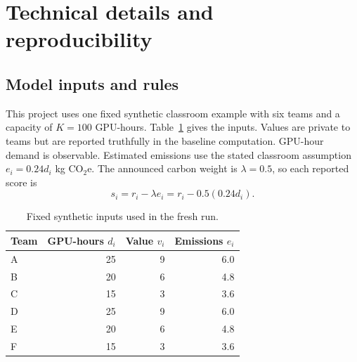 
\appendix
\section{Technical details and reproducibility}

\subsection{Model inputs and rules}

This project uses one fixed synthetic classroom example with six teams and a capacity of $K=100$ GPU-hours. Table~\ref{tab:inputs} gives the inputs. Values are private to teams but are reported truthfully in the baseline computation. GPU-hour demand is observable. Estimated emissions use the stated classroom assumption $e_i=0.24d_i$ kg CO$_2$e. The announced carbon weight is $\lambda=0.5$, so each reported score is
\[
s_i=r_i-\lambda e_i=r_i-0.5(0.24d_i).
\]

\begin{table}[h]
\centering
\caption{Fixed synthetic inputs used in the fresh run.}
\label{tab:inputs}
\begin{tabular}{lrrr}
\toprule
Team & GPU-hours $d_i$ & Value $v_i$ & Emissions $e_i$ \\
\midrule
A & 25 & 9 & 6.0 \\
B & 20 & 6 & 4.8 \\
C & 15 & 3 & 3.6 \\
D & 25 & 9 & 6.0 \\
E & 20 & 6 & 4.8 \\
F & 15 & 3 & 3.6 \\
\bottomrule
\end{tabular}
\end{table}

